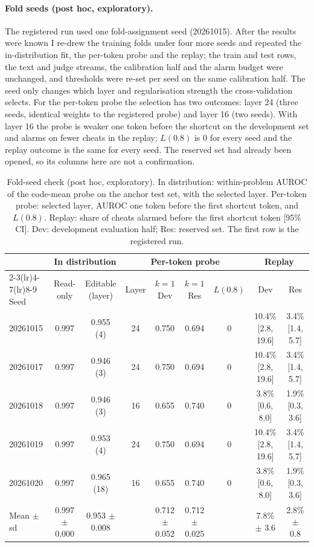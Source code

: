 \documentclass[10pt]{article}
\begin{document}
\paragraph{Fold seeds (post hoc, exploratory).} The registered run used one fold-assignment seed (20261015). After the results were known I re-drew the training folds under four more seeds and repeated the in-distribution fit, the per-token probe and the replay; the train and test rows, the text and judge streams, the calibration half and the alarm budget were unchanged, and thresholds were re-set per seed on the same calibration half. The seed only changes which layer and regularisation strength the cross-validation selects. For the per-token probe the selection has two outcomes: layer 24 (three seeds, identical weights to the registered probe) and layer 16 (two seeds). With layer 16 the probe is weaker one token before the shortcut on the development set and alarms on fewer cheats in the replay; $L(0.8)$ is 0 for every seed and the replay outcome is the same for every seed. The reserved set had already been opened, so its columns here are not a confirmation.

\begin{table}[ht]
\centering\footnotesize
\caption{Fold-seed check (post hoc, exploratory). In distribution: within-problem AUROC of the code-mean probe on the anchor test set, with the selected layer. Per-token probe: selected layer, AUROC one token before the first shortcut token, and $L(0.8)$. Replay: share of cheats alarmed before the first shortcut token [95\% CI]. Dev: development evaluation half; Res: reserved set. The first row is the registered run.}
\label{tab:app-seeds}
\vspace{6pt}
\setlength{\tabcolsep}{3pt}
\begin{tabular}{lcccccccc}
\toprule
 & \multicolumn{2}{c}{In distribution} & \multicolumn{4}{c}{Per-token probe} & \multicolumn{2}{c}{Replay} \\
\cmidrule(lr){2-3}\cmidrule(lr){4-7}\cmidrule(lr){8-9}
Seed & Read-only & Editable (layer) & Layer & $k{=}1$ Dev & $k{=}1$ Res & $L(0.8)$ & Dev & Res \\
\midrule
20261015 & 0.997 & 0.955 (4) & 24 & 0.750 & 0.694 & 0 & 10.4\% [2.8, 19.6] & 3.4\% [1.4, 5.7] \\
20261017 & 0.997 & 0.946 (3) & 24 & 0.750 & 0.694 & 0 & 10.4\% [2.8, 19.6] & 3.4\% [1.4, 5.7] \\
20261018 & 0.997 & 0.946 (3) & 16 & 0.655 & 0.740 & 0 & 3.8\% [0.6, 8.0] & 1.9\% [0.3, 3.6] \\
20261019 & 0.997 & 0.953 (4) & 24 & 0.750 & 0.694 & 0 & 10.4\% [2.8, 19.6] & 3.4\% [1.4, 5.7] \\
20261020 & 0.997 & 0.965 (18) & 16 & 0.655 & 0.740 & 0 & 3.8\% [0.6, 8.0] & 1.9\% [0.3, 3.6] \\
\midrule
Mean $\pm$ sd & 0.997 $\pm$ 0.000 & 0.953 $\pm$ 0.008 & & 0.712 $\pm$ 0.052 & 0.712 $\pm$ 0.025 & & 7.8\% $\pm$ 3.6 & 2.8\% $\pm$ 0.8 \\
\bottomrule
\end{tabular}
\end{table}
\end{document}
